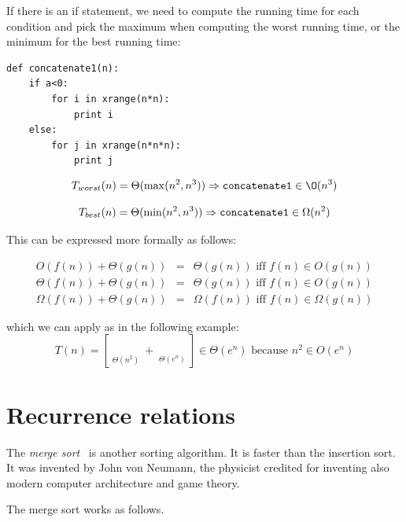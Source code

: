 \documentclass[justified,sixbynine]{tufte-book}
\def\stackunder#1#2{\mathrel{\mathop{#2}\limits_{#1}}}
\theoremstyle{plain}%
\theoremstyle{definition}
\theoremstyle{remark}
\begin{document}
\begin{fullwidth}
If there is an if statement, we need to compute the running time for each condition and pick the maximum when computing the worst running time, or the minimum for the best running time:

\begin{lstlisting}
def concatenate1(n):
    if a<0:
        for i in xrange(n*n):
            print i
    else:
        for j in xrange(n*n*n):
            print j
\end{lstlisting}

\begin{equation}
T_{worst}(n)=\Theta (\max (n^2,n^3))\Rightarrow \text{{\tt concatenate1}}\in \O(n^3)
\end{equation}

\begin{equation}
T_{best}(n)=\Theta (\min (n^2,n^3))\Rightarrow \text{{\tt concatenate1}}\in \Omega(n^2)
\end{equation}

This can be expressed more formally as follows:

\begin{eqnarray}
O(f(n))+\Theta (g(n)) &=&\Theta (g(n))\text{ iff }f(n)\in O(g(n)) \\
\Theta (f(n))+\Theta (g(n)) &=&\Theta (g(n))\text{ iff }f(n)\in O(g(n)) \\
\Omega (f(n))+\Theta (g(n)) &=&\Omega (f(n))\text{ iff }f(n)\in \Omega (g(n))
\end{eqnarray}

which we can apply as in the following example:
\begin{equation}
T(n)=[\stackunder{\Theta (n^2)}{\underbrace{n^2+n+3}}+\stackunder{\Theta
(e^n)}{\underbrace{e^n-\log n}}]\in \Theta (e^n)\text{ because }n^2\in
O(e^n)
\end{equation}

\goodbreak\section{Recurrence relations}



The {\it merge sort}~\cite{mergesort} is another sorting algorithm. It is faster than the insertion sort. It was invented by John von Neumann, the physicist credited for inventing also modern computer architecture and game theory.

The merge sort works as follows.


\end{fullwidth}
\end{document}
